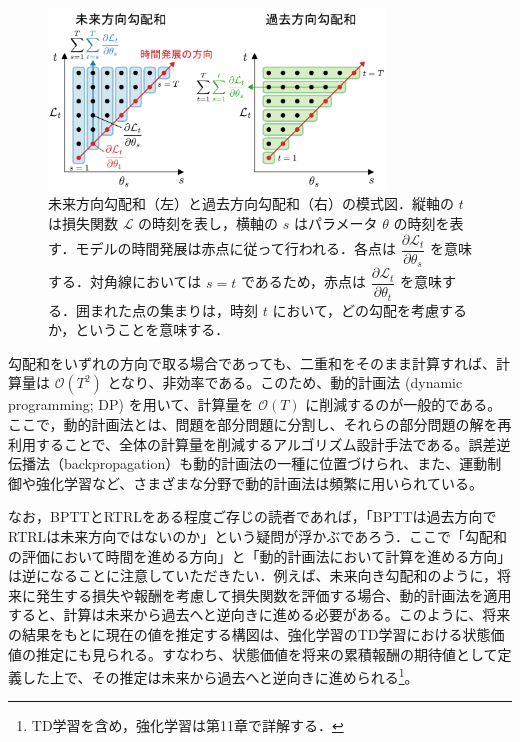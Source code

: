 \documentclass[titlepage]{ltjsbook}
\begin{document}
\begin{figure}[htbp]
\begin{center}
\includegraphics[width=0.8\textwidth]{./figures/bptt_rtrl.pdf}
\caption{未来方向勾配和（左）と過去方向勾配和（右）の模式図．縦軸の $t$ は損失関数 $\mathcal{L}$ の時刻を表し，横軸の $s$ はパラメータ $\theta$ の時刻を表す．モデルの時間発展は赤点に従って行われる．各点は $\dfrac{\partial \mathcal{L}_t}{\partial \theta_s}$ を意味する．対角線においては $s=t$ であるため，赤点は $\dfrac{\partial \mathcal{L}_t}{\partial \theta_t}$ を意味する．囲まれた点の集まりは，時刻 $t$ において，どの勾配を考慮するか，ということを意味する．}
\label{fig:bptt_rtrl}
\end{center}
\end{figure}

勾配和をいずれの方向で取る場合であっても、二重和をそのまま計算すれば、計算量は $\mathcal{O}(T^2)$ となり、非効率である。このため、動的計画法 (dynamic programming; DP) を用いて、計算量を $\mathcal{O}(T)$ に削減するのが一般的である。ここで，動的計画法とは、問題を部分問題に分割し、それらの部分問題の解を再利用することで、全体の計算量を削減するアルゴリズム設計手法である。誤差逆伝播法（backpropagation）も動的計画法の一種に位置づけられ、また、運動制御や強化学習など、さまざまな分野で動的計画法は頻繁に用いられている。

なお，BPTTとRTRLをある程度ご存じの読者であれば，「BPTTは過去方向でRTRLは未来方向ではないのか」という疑問が浮かぶであろう．ここで「勾配和の評価において時間を進める方向」と「動的計画法において計算を進める方向」は逆になることに注意していただきたい．例えば、未来向き勾配和のように，将来に発生する損失や報酬を考慮して損失関数を評価する場合、動的計画法を適用すると、計算は未来から過去へと逆向きに進める必要がある。このように、将来の結果をもとに現在の値を推定する構図は、強化学習のTD学習における状態価値の推定にも見られる。すなわち、状態価値を将来の累積報酬の期待値として定義した上で、その推定は未来から過去へと逆向きに進められる\footnote{TD学習を含め，強化学習は第11章で詳解する．}。
\end{document}
